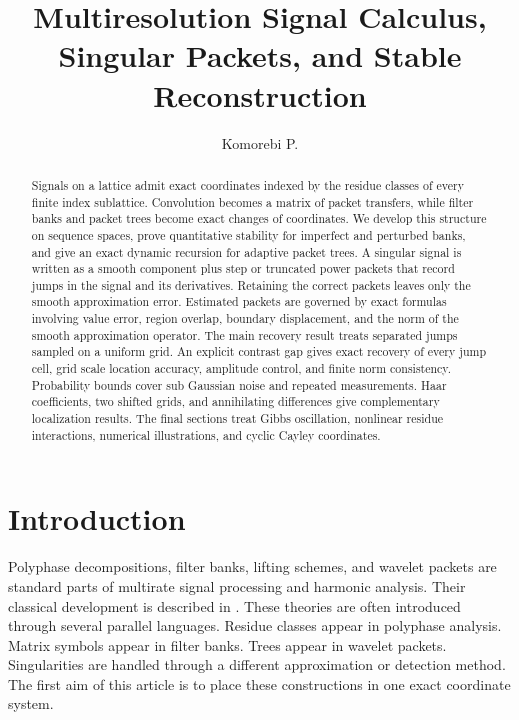 \documentclass{aomart}
\title[Multiresolution signal calculus]{Multiresolution Signal Calculus, Singular Packets, and Stable Reconstruction}
\author[Komorebi P.]{Komorebi P.}
\theoremstyle{definition}
\theoremstyle{remark}
\begin{document}
\begin{abstract}
Signals on a lattice admit exact coordinates indexed by the residue classes of every finite index sublattice. Convolution becomes a matrix of packet transfers, while filter banks and packet trees become exact changes of coordinates. We develop this structure on sequence spaces, prove quantitative stability for imperfect and perturbed banks, and give an exact dynamic recursion for adaptive packet trees. A singular signal is written as a smooth component plus step or truncated power packets that record jumps in the signal and its derivatives. Retaining the correct packets leaves only the smooth approximation error. Estimated packets are governed by exact formulas involving value error, region overlap, boundary displacement, and the norm of the smooth approximation operator. The main recovery result treats separated jumps sampled on a uniform grid. An explicit contrast gap gives exact recovery of every jump cell, grid scale location accuracy, amplitude control, and finite norm consistency. Probability bounds cover sub Gaussian noise and repeated measurements. Haar coefficients, two shifted grids, and annihilating differences give complementary localization results. The final sections treat Gibbs oscillation, nonlinear residue interactions, numerical illustrations, and cyclic Cayley coordinates.
\end{abstract}
\maketitle
\thispagestyle{plain}

\section{Introduction}\label{sec:introduction}

Polyphase decompositions, filter banks, lifting schemes, and wavelet packets are standard parts of multirate signal processing and harmonic analysis. Their classical development is described in \cite{CrochiereRabiner1983,Vaidyanathan1993,VetterliKovacevic1995,StrangNguyen1996,Daubechies1992,Mallat2009}. These theories are often introduced through several parallel languages. Residue classes appear in polyphase analysis. Matrix symbols appear in filter banks. Trees appear in wavelet packets. Singularities are handled through a different approximation or detection method. The first aim of this article is to place these constructions in one exact coordinate system.
\end{document}
